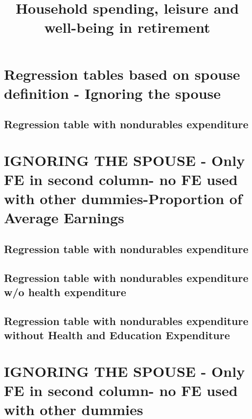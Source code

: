 \documentclass[a4paper,landscape]{article}
\begin{document}
	
	\title{Household spending, leisure and well-being in retirement}
	\date{}
	\maketitle
	
\section{Regression tables based on spouse definition - Ignoring the spouse}
\subsection{Regression table with nondurables expenditure}

\clearpage

\section{IGNORING THE SPOUSE - Only FE in second column- no FE used with other dummies-Proportion of Average Earnings}

\subsection{Regression table with nondurables expenditure }

\clearpage

\subsection{Regression table with nondurables expenditure w/o health expenditure} 

\clearpage

\subsection{Regression table with nondurables expenditure without Health and Education Expenditure}

\clearpage



\section{IGNORING THE SPOUSE - Only FE in second column- no FE used with other dummies}
\end{document}
